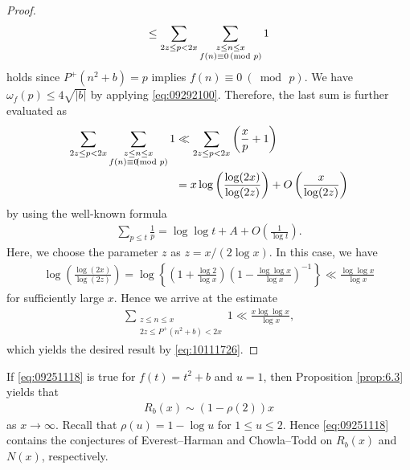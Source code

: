 \documentclass[a4paper,11pt]{amsart}
\theoremstyle{definition}
\numberwithin{equation}{section}
\begin{document}
\begin{proof}
\begin{align*}
\leq \sum_{2z \leq p < 2x} 
\sum_{\substack{z \leq n \leq x \\ f(n) \equiv 0~ \hspace{-2mm} \pmod{p}}} 1
\end{align*}
holds since $P^+(n^2+b)=p$ implies $f(n) \equiv 0 ~(\bmod\,{p})$. 
We have $\omega_f(p) \leq 4 \sqrt{|b|}$ by applying \eqref{eq:09292100}. 
Therefore, the last sum is further evaluated as
\begin{align*}
\sum_{2z \leq p < 2x} 
\sum_{\substack{z \leq n \leq x \\ f(n) \equiv 0 \hspace{-2mm} \pmod{p}}} 1
&\ll \sum_{2z \leq p < 2x} \left(\frac{x}{p}+1\right) \\
&= x \log \left(\frac{\log(2x)}{\log(2z)}\right)
+ O\left(\frac{x}{\log(2z)}\right)
\end{align*}
by using the well-known formula
\begin{align*}
\sum_{p \leq t} \frac{1}{p}
= \log\log{t}+A+O\left(\frac{1}{\log{t}}\right). 
\end{align*}
Here, we choose the parameter $z$ as $z=x/(2\log{x})$. 
In this case, we have 
\begin{align*}
\log \left(\frac{\log(2x)}{\log(2z)}\right)
= \log \left\{\left(1+\frac{\log{2}}{\log{x}}\right)\left(1-\frac{\log\log{x}}{\log{x}}\right)^{-1}\right\}
\ll \frac{\log\log{x}}{\log{x}}
\end{align*}
for sufficiently large $x$. 
Hence we arrive at the estimate
\begin{align*}
\sum_{\substack{z \leq n \leq x \\ 2z \leq P^+(n^2+b)<2x}} 1
\ll \frac{x \log\log{x}}{\log{x}}, 
\end{align*}
which yields the desired result by \eqref{eq:10111726}. 
\end{proof}

If \eqref{eq:09251118} is true for $f(t)=t^2+b$ and $u=1$, then Proposition \ref{prop:6.3} yields that
\begin{align*}
R_b(x)
\sim (1-\rho(2))x
\end{align*}
as $x \to\infty$. 
Recall that $\rho(u)=1-\log{u}$ for $1 \leq u \leq 2$. 
Hence \eqref{eq:09251118} contains the conjectures of Everest--Harman and Chowla--Todd on $R_b(x)$ and $N(x)$, respectively.  
\end{document}
